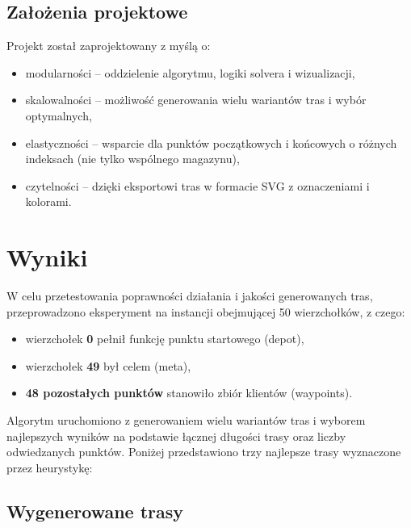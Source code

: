 \documentclass{article}
\begin{document}
\subsection*{Założenia projektowe}

Projekt został zaprojektowany z myślą o:
\begin{itemize}
    \item modularności – oddzielenie algorytmu, logiki solvera i wizualizacji,
    \item skalowalności – możliwość generowania wielu wariantów tras i wybór optymalnych,
    \item elastyczności – wsparcie dla punktów początkowych i końcowych o różnych indeksach (nie tylko wspólnego magazynu),
    \item czytelności – dzięki eksportowi tras w formacie SVG z oznaczeniami i kolorami.
\end{itemize}

\section{Wyniki}

W celu przetestowania poprawności działania i jakości generowanych tras, przeprowadzono eksperyment na instancji obejmującej 50 wierzchołków, z czego:
\begin{itemize}
    \item wierzchołek \textbf{0} pełnił funkcję punktu startowego (depot),
    \item wierzchołek \textbf{49} był celem (meta),
    \item \textbf{48 pozostałych punktów} stanowiło zbiór klientów (waypoints).
\end{itemize}

Algorytm uruchomiono z generowaniem wielu wariantów tras i wyborem najlepszych wyników na podstawie łącznej długości trasy oraz liczby odwiedzanych punktów. Poniżej przedstawiono trzy najlepsze trasy wyznaczone przez heurystykę:
\subsection*{Wygenerowane trasy}
\end{document}
